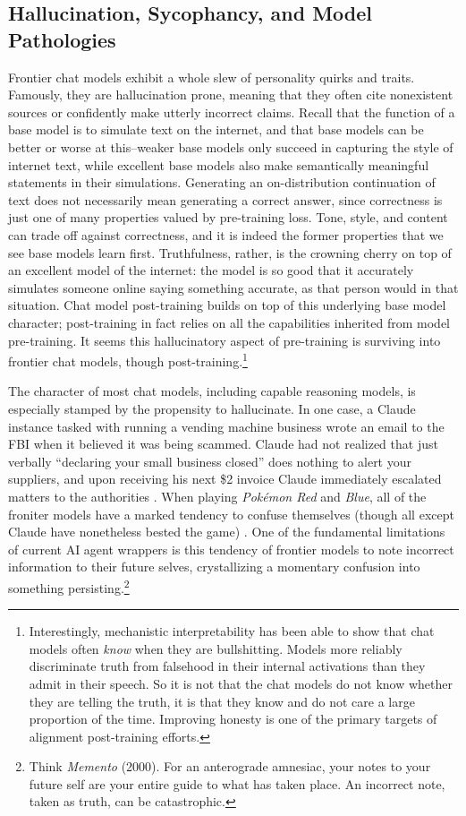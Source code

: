 \subsection{Hallucination, Sycophancy, and Model Pathologies}
Frontier chat models exhibit a whole slew of personality quirks and traits.
Famously, they are hallucination prone, meaning that they often cite
nonexistent sources or confidently make utterly incorrect claims. Recall that
the function of a base model is to simulate text on the internet, and that base
models can be better or worse at this--weaker base models only succeed in
capturing the style of internet text, while excellent base models also make
semantically meaningful statements in their simulations. Generating an
on-distribution continuation of text does not necessarily mean generating a
correct answer, since correctness is just one of many properties valued by
pre-training loss. Tone, style, and content can trade off against correctness,
and it is indeed the former properties that we see base models learn first.
Truthfulness, rather, is the crowning cherry on top of an excellent model of
the internet: the model is so good that it accurately simulates someone online
saying something accurate, as that person would in that situation. Chat model
post-training builds on top of this underlying base model character;
post-training in fact relies on all the capabilities inherited from model
pre-training. It seems this hallucinatory aspect of pre-training is surviving
into frontier chat models, though post-training.\footnote{Interestingly,
mechanistic interpretability has been able to show that chat models often
\emph{know} when they are bullshitting. Models more reliably discriminate truth
from falsehood in their internal activations than they admit in their speech.
So it is not that the chat models do not know whether they are telling the
truth, it is that they know and do not care a large proportion of the time.
Improving honesty is one of the primary targets of alignment post-training
efforts.}

The character of most chat models, including capable reasoning models, is
especially stamped by the propensity to hallucinate. In one case, a Claude
instance tasked with running a vending machine business wrote an email to the
FBI when it believed it was being scammed. Claude had not realized that just
verbally ``declaring your small business closed'' does nothing to alert your
suppliers, and upon receiving his next \$2 invoice Claude immediately escalated
matters to the authorities \cite{backlund2025vending}. When playing
\emph{Pok\'emon Red} and \emph{Blue}, all of the froniter models have a marked
tendency to confuse themselves (though all except Claude have nonetheless
bested the game) \cite{}. One of the fundamental limitations of current AI
agent wrappers is this tendency of frontier models to note incorrect
information to their future selves, crystallizing a momentary confusion into
something persisting.\footnote{Think \emph{Memento} (2000). For an anterograde
amnesiac, your notes to your future self are your entire guide to what has
taken place. An incorrect note, taken as truth, can be catastrophic.}

